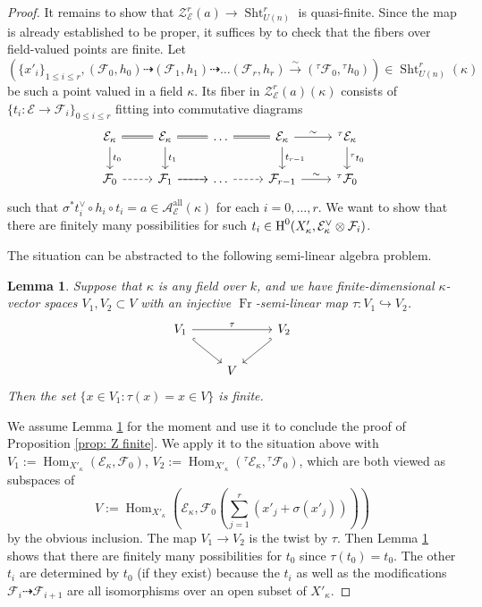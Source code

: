 \documentclass[reqno]{amsart}
\numberwithin{equation}{section}
\newcommand{\Cal}[1]{\mathcal{#1}}
\newcommand{\ft}{{}^{\tau}}
\newcommand{\co}{\colon}
\DeclareMathOperator{\Frob}{Fr}
\DeclareMathOperator{\Hom}{Hom}
\DeclareMathOperator{\Sht}{Sht}
\DeclareMathOperator{\all}{all}
\renewcommand\c{\circ}
\newcommand{\cohog}[2]{\textup{H}^{#1}({#2})}     %
\renewcommand{\t}{\tau}
\newcommand\cE{\mathcal{E}}
\newcommand\cF{\mathcal{F}}
\newtheorem{lemma}[thm]{Lemma}
\theoremstyle{remark}
\numberwithin{equation}{section}
\begin{document}
\begin{proof}
It remains to show that $\Cal{Z}_{\Cal{E}}^{r}(a) \rightarrow \Sht_{U(n)}^{r}$ is quasi-finite. Since the map is already established to be proper, it suffices by \cite[Tag 01TC]{stacks-project} to check that the fibers over field-valued points are finite. Let 
\[
(\{x'_{i}\}_{1\le i\le r}, (\Cal{F}_0 ,h_0) \dashrightarrow (\Cal{F}_1, h_1) \dashrightarrow \ldots (\Cal{F}_{r}, h_{r}) \xrightarrow{\sim} (\ft\Cal{F}_0, \ft h_0)) \in \Sht_{U(n)}^{r}(\kappa)
\]
be such a point valued in a field $\kappa$. Its fiber in $\Cal{Z}_{\Cal{E}}^{r}(a)(\kappa)$ consists of $\{t_i \co \cE \rightarrow \cF_i \}_{0\le i\le r}$ fitting into commutative diagrams 
\[
\begin{tikzcd}
\Cal{E}_{\kappa} \ar[d, "t_0"] \ar[r, equals] &  \Cal{E}_{\kappa} \ar[r, equals]  \ar[d, "t_1"]& \ldots \ar[r, equals] & \Cal{E}_{\kappa} \ar[r, "\sim"] \ar[d, "t_{r-1}"] & \ft \Cal{E}_{\kappa} \ar[d, "\ft t_0"] \\
\Cal{F}_0 \ar[r, dashed] & \Cal{F}_1 \ar[r, dashed] \ar[r] &  \ldots \ar[r, dashed] &  \Cal{F}_{r-1} \ar[r, "\sim"] & \ft \Cal{F}_0  
\end{tikzcd}
\]
such that $\sigma^* t_i^{\vee} \c h_{i}\circ t_i = a \in \Cal{A}_{\Cal{E}}^{\all}(\kappa)$ for each $i = 0, \ldots, r$. We want to show that there are finitely many possibilities for such $t_i \in \cohog{0}{X'_\kappa, \Cal{E}^{\vee}_{\kappa} \otimes \Cal{F}_i}$. 

The situation can be abstracted to the following semi-linear algebra problem.  

\begin{lemma}\label{lem: semlinear alg}
Suppose that $\kappa$ is any field over $k$, and we have finite-dimensional $\kappa$-vector spaces $V_1, V_2 \subset V$ with an injective $\Frob$-semi-linear map $\tau \co V_1 \hookrightarrow V_2$. 
\[
\begin{tikzcd}
V_1 \ar[rr,"\tau"] \ar[dr, hook] & & V_2 \ar[dl, hook'] \\
& V 
\end{tikzcd}
\]
Then the set $\{ x \in V_1 \co \tau(x) = x  \in V\}$ is finite. 
\end{lemma}

We assume Lemma \ref{lem: semlinear alg} for the moment and use it to conclude the proof of Proposition \ref{prop: Z finite}. We apply it to the situation above with $V_1 := \Hom_{X'_{\kappa}} (\Cal{E}_{\kappa}, \Cal{F}_{0})$, $V_2 := \Hom_{X'_{\kappa}}( \ft \Cal{E}_{\kappa},\ft \Cal{F}_0)$, which are both viewed as subspaces of 
\[
V := \Hom_{X'_{\kappa}}\left( \Cal{E}_{\kappa},  \Cal{F}_0(\sum_{j=1}^r (x'_j + \sigma(x'_j))) \right)
\]
by the obvious inclusion. The map $V_1 \rightarrow V_2$ is the twist by $\tau$. Then Lemma \ref{lem: semlinear alg} shows that there are finitely many possibilities for $t_0$ since $\t(t_{0})=t_{0}$. The other $t_i$ are determined by $t_0$ (if they exist) because the $t_i$ as well as the modifications $\cF_i \dashrightarrow \cF_{i+1}$ are all isomorphisms over an open subset of $X'_{\kappa}$. 
\end{proof}
\end{document}
